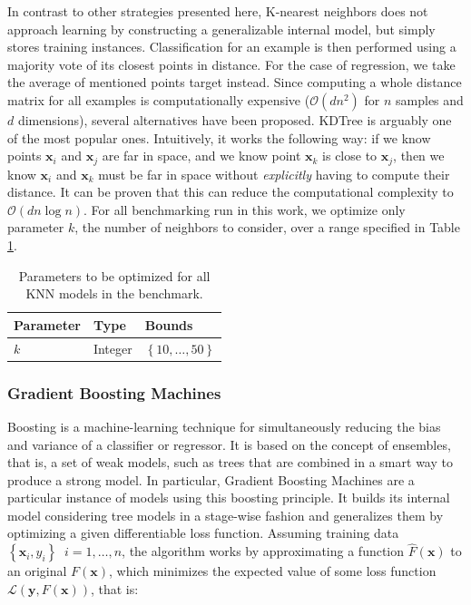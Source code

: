 \documentclass[10pt,a4paper,twoside]{book}
\begin{document}
In contrast to other strategies presented here, K-nearest neighbors does not approach learning by constructing a generalizable internal model, but simply stores training instances. Classification for an example is then performed using a majority vote of its closest points in distance. For the case of regression, we take the average of mentioned points target instead. Since computing a whole distance matrix for all examples is computationally expensive ($\mathcal{O}(dn^2)$ for $n$ samples and $d$ dimensions), several alternatives have been proposed. KDTree \cite{Kennel2004} is arguably one of the most popular ones. Intuitively, it works the following way: if we know points $\boldsymbol{x}_i$ and $\boldsymbol{x}_j$ are far in space, and we know point $\boldsymbol{x}_k$ is close to $\boldsymbol{x}_j$, then we know $\boldsymbol{x}_i$ and $\boldsymbol{x}_k$ must be far in space without \textit{explicitly} having to compute their distance. It can be proven that this can reduce the computational complexity to $\mathcal{O}(dn\log n)$. For all benchmarking run in this work, we optimize only parameter $k$, the number of neighbors to consider, over a range specified in Table \ref{knnparams}.

\begin{table}[]
\centering
\caption{Parameters to be optimized for all KNN models in the benchmark.}
\label{knnparams}
\begin{tabular}{@{}lll@{}}
\toprule
\textbf{Parameter} & \textbf{Type} & \textbf{Bounds}                           \\ \midrule
$k$                & Integer       & $\left\lbrace 10, \dots,50 \right\rbrace$
\end{tabular}
\end{table}

\subsubsection{Gradient Boosting Machines}

Boosting \cite{Schapire1999} is a machine-learning technique for simultaneously reducing the bias and variance of a classifier or regressor. It is based on the concept of ensembles, that is, a set of weak models, such as trees that are combined in a smart way to produce a strong model. In particular, Gradient Boosting Machines \cite{Friedman2001} are a particular instance of models using this boosting principle. It builds its internal model considering tree models in a stage-wise fashion and generalizes them by optimizing a given differentiable loss function. Assuming training data $\left\lbrace \boldsymbol{x}_i, y_i\right\rbrace\;\; i=1,\dots,n$, the algorithm works by approximating a function $\hat{F}(\boldsymbol{x})$ to an original $F(\boldsymbol{x})$, which minimizes the expected value of some loss function $\mathcal{L}\left(\boldsymbol{y}, F(\boldsymbol{x})\right)$, that is:
\end{document}
